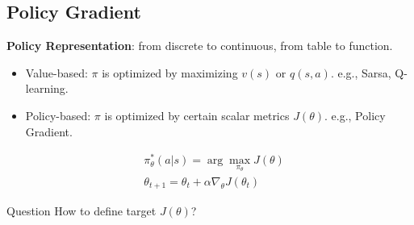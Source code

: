 \subsection{Policy Gradient}
\begin{frame}
    \textbf{Policy Representation}: from discrete to continuous, from table to function. 
    \begin{itemize}
        \item Value-based: $\pi$ is optimized by maximizing $v(s)$ or $q(s,a)$. 
            e.g., Sarsa, Q-learning.
        \item Policy-based: $\pi$ is optimized by certain scalar metrics $J(\theta)$.
            e.g., Policy Gradient.
    \end{itemize}
    \begin{align*}
        &\pi_{\theta}^*(a|s) = \arg \max_{\pi_\theta} J(\theta) \\
        &\theta_{t+1} = \theta_t + \alpha \nabla_\theta J(\theta_t)
    \end{align*}

    \begin{block}{Question}
        How to define target $J(\theta)$?
    \end{block}
\end{frame}
